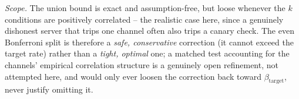 \documentclass[10pt,journal,compsoc]{IEEEtran}
\begin{document}
\noindent \emph{Scope.} The union bound is exact and assumption-free, but loose whenever the $k$ conditions are positively correlated -- the realistic case here, since a genuinely dishonest server that trips one channel often also trips a canary check. The even Bonferroni split is therefore a \emph{safe, conservative} correction (it cannot exceed the target rate) rather than a \emph{tight, optimal} one; a matched test accounting for the channels' empirical correlation structure is a genuinely open refinement, not attempted here, and would only ever loosen the correction back toward $\beta_{\text{target}}$, never justify omitting it.
\end{document}
